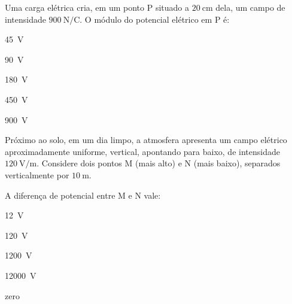 \begin{questao}[2]{}

Uma carga elétrica cria, em um ponto P situado a $\SI{20}{\centi\meter}$ dela, um
campo de intensidade $\SI{900}{\newton\per\coulomb}$. O módulo do potencial
elétrico em P é:
\begin{alternativas}[3]
\item \SI{45}{\volt}
\item \SI{90}{\volt}
\item \SI{180}{\volt}
\item \SI{450}{\volt}
\item \SI{900}{\volt}
\end{alternativas}


\end{questao}
\begin{questao}[2]{}

Próximo ao solo, em um dia limpo, a atmosfera apresenta um campo elétrico
aproximadamente uniforme, vertical, apontando para baixo, de intensidade
$\SI{120}{\volt\per\meter}$. Considere dois pontos M (mais alto) e N (mais baixo),
separados verticalmente por $\SI{10}{\meter}$.


A diferença de potencial entre M e N vale:
\begin{alternativas}[2]
\item \SI{12}{\volt}
\item \SI{120}{\volt}
\item \SI{1200}{\volt}
\item \SI{12000}{\volt}
\item zero
\end{alternativas}


\end{questao}

